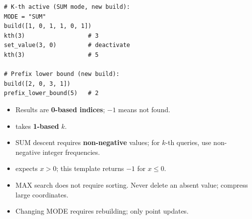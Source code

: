 \documentclass[9pt,a4paper]{extarticle}
\begin{document}
\begin{minipage}[t]{\textwidth}
\begin{minipage}[t]{0.475\linewidth}
\begin{lstlisting}
# K-th active (SUM mode, new build):
MODE = "SUM"
build([1, 0, 1, 1, 0, 1])
kth(3)                  # 3
set_value(3, 0)         # deactivate
kth(3)                  # 5

# Prefix lower bound (new build):
build([2, 0, 3, 1])
prefix_lower_bound(5)   # 2
\end{lstlisting}


\begin{itemize}[
  leftmargin=11pt,
  topsep=0pt,
  itemsep=2pt,
  parsep=0pt
]

\item Results are \textbf{0-based indices};
$-1$ means not found.

\item {} takes \textbf{1-based} $k$.

\item SUM descent requires \textbf{non-negative}
values; for $k$-th queries, use non-negative
integer frequencies.

\item {} expects
$x>0$; this template returns $-1$ for $x\le0$.

\item MAX search does not require sorting.
Never delete an absent value; compress large
coordinates.

\item Changing MODE requires rebuilding;
only point updates.

\end{itemize}

\end{minipage}%
\end{minipage}

\endgroup



\clearpage
\begingroup
{}
\newcommand{\eghead}[1]{\par\vspace{5pt}\noindent
 {\bfseries\fontsize{11.3}{13.42}\selectfont #1}\par\vspace{1pt}\hrule\vspace{3pt}}
\newcommand{\egbody}[1]{\begingroup\raggedright
 \fontsize{10.6}{13.07}\selectfont #1\par\endgroup}
\newcommand{\egcode}[1]{{\ttfamily\fontsize{9.3}{10.97}\selectfont\detokenize{#1}}}
\end{document}
